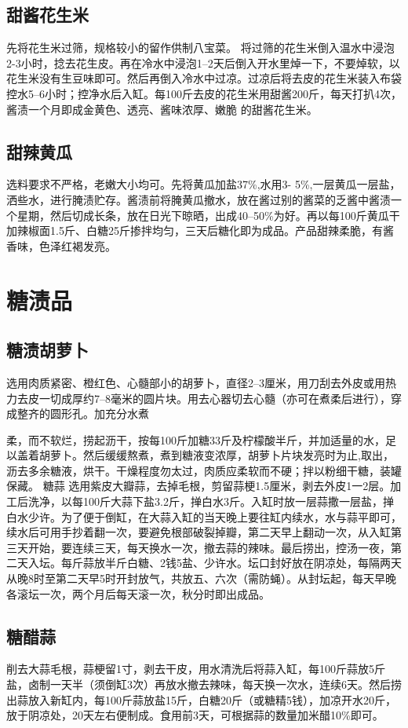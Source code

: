 \documentclass{ctexbook}
\begin{document}
\subsection{甜酱花生米}
先将花生米过筛，规格较小的留作供制八宝菜。
将过筛的花生米倒入温水中浸泡2-3小时，捻去花生皮。再在冷水中浸泡1--2天后倒入开水里焯一下，不要焯软，以花生米没有生豆味即可。然后再倒入冷水中过凉。过凉后将去皮的花生米装入布袋控水5--6小时；控净水后入缸。每100斤去皮的花生米用甜酱200斤，每天打扒4次，酱渍一个月即成金黄色、透亮、酱味浓厚、嫩脆
的甜酱花生米。
\subsection{甜辣黄瓜}
选料要求不严格，老嫩大小均可。先将黄瓜加盐37\%,水用3-
5\%,一层黄瓜一层盐，洒些水，进行腌渍贮存。酱渍前将腌黄瓜撤水，放在酱过别的酱菜的乏酱中酱渍一个星期，然后切成长条，放在日光下晾晒，出成40--50\%为好。再以每100斤黄瓜干加辣椒面1.5斤、白糖25斤掺拌均匀，三天后糖化即为成品。产品甜辣柔脆，有酱香味，色泽红褐发亮。
\section{糖渍品}
\subsection{糖渍胡萝卜}
选用肉质紧密、橙红色、心髓部小的胡萝卜，直径2--3厘米，用刀刮去外皮或用热力去皮一切成厚约7--8毫米的圆片块。用去心器切去心髓（亦可在煮柔后进行），穿成整齐的圆形孔。加充分水煮

柔，而不软烂，捞起沥干，按每100斤加糖33斤及柠檬酸半斤，并加适量的水，足以盖着胡萝卜。然后缓缓熬煮，煮到糖液变浓厚，胡萝卜片块发亮时为止,取出，沥去多余糖液，烘干。干燥程度勿太过，肉质应柔软而不硬；拌以粉细干糖，装罐保藏。
糖蒜
选用紫皮大瓣蒜，去掉毛根，剪留蒜梗1.5厘米，剥去外皮1一2层。加工后洗净，以每100斤大蒜下盐3.2斤，掸白水3斤。入缸时放一层蒜撒一层盐，掸白水少许。为了便于倒缸，在大蒜入缸的当天晚上要往缸内续水，水与蒜平即可，续水后可用手抄着翻一次，要避免根部破裂掉瓣，第二天早上翻动一次，从入缸第三天开始，要连续三天，每天换水一次，撤去蒜的辣味。最后捞出，控汤一夜，第二天入坛。每斤蒜放半斤白糖、2钱5盐、少许水。坛口封好放在阴凉处，每隔两天从晚8时至第二天早5时开封放气，共放五、六次（需防蝇）。从封坛起，每天早晚各滚坛一次，两个月后每天滚一次，秋分时即出成品。
\subsection{糖醋蒜}
削去大蒜毛根，蒜梗留1寸，剥去干皮，用水清洗后将蒜入缸，每100斤蒜放5斤盐，卤制一天半（须倒缸3次）再放水撤去辣味，每天换一次水，连续6天。然后捞出蒜放入新缸内，每100斤蒜放盐15斤，白糖20斤（或糖精5钱），加凉开水20斤，放于阴凉处，20天左右便制成。食用前3天，可根据蒜的数量加米醋10\%即可。
\end{document}
